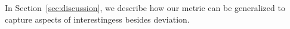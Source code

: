 In Section~\ref{sec:discussion}, we describe how our metric
can be generalized to capture aspects of interestingess besides
deviation.







